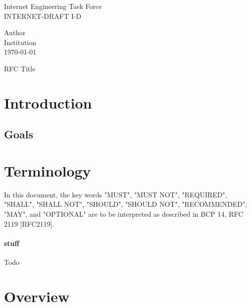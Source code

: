 \documentclass[10pt]{article}
\newcommand{\rfcId}{I-D}
\newcommand{\rfcTitle}{RFC Title}
\newcommand{\rfcAuthor}{Author}
\newcommand{\rfcDate}{\today}
\newcommand{\rfcInstitution}{Institution}
\begin{document}
\begin{multicols}{2}
	\begin{flushleft}
		Internet Engineering Task Force \\
		INTERNET-DRAFT \rfcId
	\end{flushleft}
\columnbreak
	\begin{flushright}
		\rfcAuthor \\
		\rfcInstitution \\
		\rfcDate
	\end{flushright}
\end{multicols}

\vspace{1in} { \center \rfcTitle \\ } \vspace{1in}

\begin{abstract}
	\lipsum[1]
\end{abstract}
\pagebreak

\tableofcontents
\pagebreak

\section{Introduction}{
    \lipsum[2]

	\subsection{Goals}{
		\lipsum[3]
	}
}
\pagebreak

\section{Terminology}{
	In this document, the key words "MUST", "MUST NOT", "REQUIRED",
	"SHALL", "SHALL NOT", "SHOULD", "SHOULD NOT", "RECOMMENDED", "MAY",
	and "OPTIONAL" are to be interpreted as described in BCP 14, RFC 2119   [RFC2119].
	
	\paragraph{stuff} Todo
}
\pagebreak

\section{Overview}{
	\lipsum[4]
}
\end{document}

